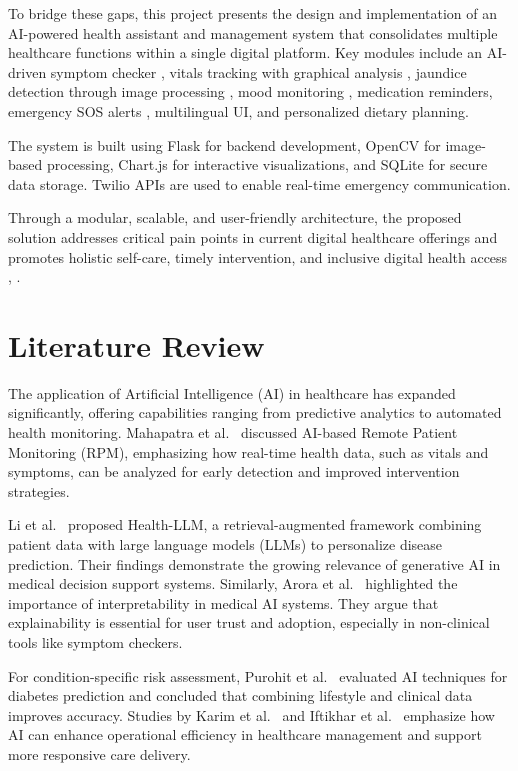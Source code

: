 \documentclass[conference]{IEEEtran}
\begin{document}
To bridge these gaps, this project presents the design and implementation of an AI-powered health assistant and management system that consolidates multiple healthcare functions within a single digital platform. Key modules include an AI-driven symptom checker \cite{li2024healthllm}, vitals tracking with graphical analysis \cite{xu2021recommendation}, jaundice detection through image processing \cite{chowdhury2021ai}, mood monitoring \cite{shatte2019machine}, medication reminders, emergency SOS alerts \cite{twilio}, multilingual UI, and personalized dietary planning.

The system is built using Flask \cite{flaskdocs} for backend development, OpenCV \cite{opencv} for image-based processing, Chart.js \cite{chartjs} for interactive visualizations, and SQLite \cite{sqlite} for secure data storage. Twilio APIs are used to enable real-time emergency communication.

Through a modular, scalable, and user-friendly architecture, the proposed solution addresses critical pain points in current digital healthcare offerings and promotes holistic self-care, timely intervention, and inclusive digital health access \cite{ben2021personalized}, \cite{li2023advances}.


\section{Literature Review}

The application of Artificial Intelligence (AI) in healthcare has expanded significantly, offering capabilities ranging from predictive analytics to automated health monitoring. Mahapatra et al.~\cite{mahapatra2023remote} discussed AI-based Remote Patient Monitoring (RPM), emphasizing how real-time health data, such as vitals and symptoms, can be analyzed for early detection and improved intervention strategies.

Li et al.~\cite{li2024healthllm} proposed Health-LLM, a retrieval-augmented framework combining patient data with large language models (LLMs) to personalize disease prediction. Their findings demonstrate the growing relevance of generative AI in medical decision support systems. Similarly, Arora et al.~\cite{arora2023interpretable} highlighted the importance of interpretability in medical AI systems. They argue that explainability is essential for user trust and adoption, especially in non-clinical tools like symptom checkers.

For condition-specific risk assessment, Purohit et al.~\cite{purohit2023precision} evaluated AI techniques for diabetes prediction and concluded that combining lifestyle and clinical data improves accuracy. Studies by Karim et al.~\cite{karim2023aihealth} and Iftikhar et al.~\cite{iftikhar2023impact} emphasize how AI can enhance operational efficiency in healthcare management and support more responsive care delivery.
\end{document}
